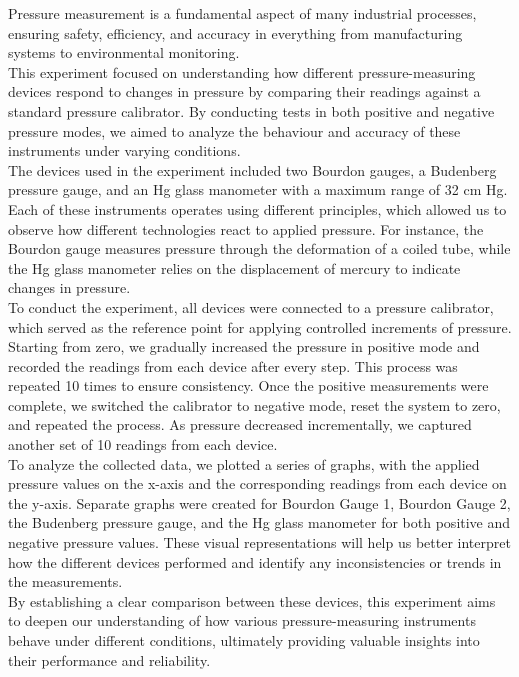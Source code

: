 \documentclass{article}
\begin{document}
	Pressure measurement is a fundamental aspect of many industrial processes, ensuring safety, efficiency, and accuracy in everything from manufacturing systems to environmental monitoring.\\[1em] 
	This experiment focused on understanding how different pressure-measuring devices respond to changes in pressure by comparing their readings against a standard pressure calibrator. By conducting tests in both positive and negative pressure modes, we aimed to analyze the behaviour and accuracy of these instruments under varying conditions. \\[1em]
	The devices used in the experiment included two Bourdon gauges, a Budenberg pressure gauge, and an Hg glass manometer with a maximum range of 32 cm Hg. Each of these instruments operates using different principles, which allowed us to observe how different technologies react to applied pressure. For instance, the Bourdon gauge measures pressure through the deformation of a coiled tube, while the Hg glass manometer relies on the displacement of mercury to indicate changes in pressure. \\[1em]
	To conduct the experiment, all devices were connected to a pressure calibrator, which served as the reference point for applying controlled increments of pressure. Starting from zero, we gradually increased the pressure in positive mode and recorded the readings from each device after every step. This process was repeated 10 times to ensure consistency. Once the positive measurements were complete, we switched the calibrator to negative mode, reset the system to zero, and repeated the process. As pressure decreased incrementally, we captured another set of 10 readings from each device. \\[1em]
	To analyze the collected data, we plotted a series of graphs, with the applied pressure values on the x-axis and the corresponding readings from each device on the y-axis. Separate graphs were created for Bourdon Gauge 1, Bourdon Gauge 2, the Budenberg pressure gauge, and the Hg glass manometer for both positive and negative pressure values. These visual representations will help us better interpret how the different devices performed and identify any inconsistencies or trends in the measurements. \\[1em]
	By establishing a clear comparison between these devices, this experiment aims to deepen our understanding of how various pressure-measuring instruments behave under different conditions, ultimately providing valuable insights into their performance and reliability. 
\end{document}
